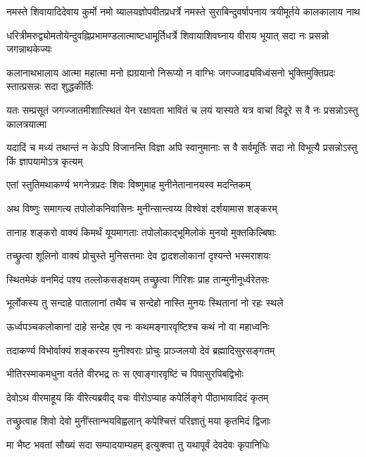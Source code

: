 \twolineshloka
{नमस्ते शिवायादिदेवाय कुर्मो नमो व्यालयज्ञोपवीतप्रधर्त्रे}
{नमस्ते सुराबिन्दुवर्षापनाय त्रयीमूर्तये कालकालाय नाथ}%

\twolineshloka
{धरित्रीमरुद्व्योमतोयेन्दुवह्निप्रभामण्डलात्माष्टधामूर्तिधर्त्रे}
{शिवायाशिवघ्नाय वीराय भूयात् सदा नः प्रसन्नो जगन्नाथकेज्यः}%

\twolineshloka
{कलानाथभालाय आत्मा महात्मा मनो ह्यग्रयानो निरूप्यो न वाग्भिः}
{जगज्जाढ्यविध्वंसनो भुक्तिमुक्तिप्रदः स्तात्प्रसन्नः सदा शुद्धकीर्तिः}%

\twolineshloka
{यतः सम्प्रसूतं जगज्जातमीशात्स्थितं येन रक्षावता भावितं च}
{लयं यास्यते यत्र वाचां विदूरे स वै नः प्रसन्नोऽस्तु कालत्रयात्मा}%

\twolineshloka
{यदादिं च मध्यं तथान्तं न केऽपि विजानन्ति विज्ञा अपि स्वानुमानाः}
{स वै सर्वमूर्तिः सदा नो विभूत्यै प्रसन्नोऽस्तु किं ज्ञापयामोऽत्र कृत्यम्}%

\twolineshloka
{एतां स्तुतिमथाकर्ण्य भगनेत्रप्रदः शिवः}
{विष्णुमाह मुनीनेतानानयस्व मदन्तिकम्}%

\twolineshloka
{अथ विष्णुः समागत्य तपोलोकनिवासिनः}
{मुनीन्सान्त्वय्य विश्वेशं दर्शयामास शङ्करम्}%

\twolineshloka
{तानाह शङ्करो वाक्यं किमर्थं यूयमागताः}
{तपोलोकाद्भूमिलोकं मुनयो मुक्तकिल्बिषाः}%

\twolineshloka
{तच्छ्रुत्वा शूलिनो वाक्यं प्रोचुस्ते मुनिसत्तमाः}
{देव द्वादशलोकानां दृश्यन्ते भस्मराशयः}%

\twolineshloka
{स्थितमेकं वनमिदं पश्य तल्लोकसङ्क्षयम्}
{तच्छ्रुत्वा गिरिशः प्राह तान्मुनीनूर्ध्वरेतसः}%

\twolineshloka
{भूर्लोकस्य तु सन्दाहे पातालानां तथैव च}
{सन्देहो नास्ति मुनयः स्थितानां नो रहः स्थले}%

\twolineshloka
{ऊर्ध्वपञ्चकलोकानां दाहे सन्देह एव नः}
{कथमङ्गारवृष्टिश्च कथं नो वा महाध्वनिः}%

\twolineshloka
{तदाकर्ण्य विभोर्वाक्यं शङ्करस्य मुनीश्वराः}
{प्रोचुः प्राञ्जलयो देवं ब्रह्मादिसुरसङ्गतम्}%

\twolineshloka
{भीतिरस्माकमधुना वर्तते वीरभद्र तः}
{स एवाङ्गारवृष्टिं च पिपासुरपिबद्विभोः}%

\twolineshloka
{देवोऽथ वीरमाहूय किं वीरेत्यब्रवीद् वचः}
{वीरोऽप्याह कपेर्लिङ्गे पीठाभावादिदं कृतम्}%

\twolineshloka
{तच्छ्रुत्वाह शिवो देवो मुनींस्तान्भयविह्वलान्}
{कपेश्चित्तं परिज्ञातुं मया कृतमिदं द्विजाः}%

\twolineshloka
{मा भैष्ट भवतां सौख्यं सदा सम्पादयाम्यहम्}
{इत्युक्त्वा तु यथापूर्वं देवदेवः कृपानिधिः}%

